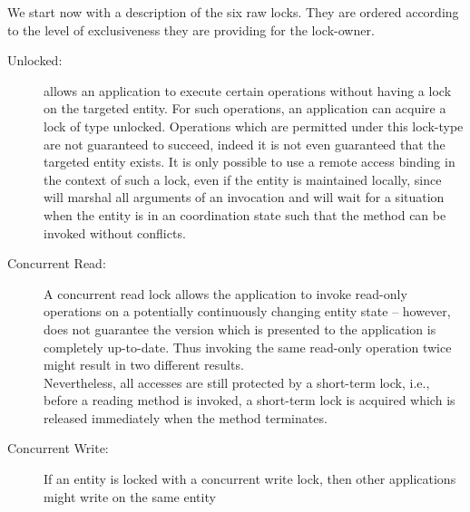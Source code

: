 \documentclass[a4paper, 10pt]{book}
\begin{document}
                        We start now with a description of the six raw locks. They are ordered
                        according to the level of exclusiveness they are providing for the
                        lock-owner. 
                        \begin{description}
                            \item[Unlocked:] \SYNEIGHT allows an application to execute certain
                                operations without having a lock on the targeted entity. For such
                                operations, an application can acquire a lock of type unlocked.
                                Operations which are permitted under this lock-type are not
                                guaranteed to succeed, indeed it is not even guaranteed that the
                                targeted entity exists. 
                                It is only possible to use a remote access binding in the context of
                                such a lock, even if the entity is maintained locally, since \SYNEIGHT
                                will marshal all arguments of an invocation and will wait for a
                                situation when the entity is in an coordination state such that the
                                method can be invoked without conflicts. 
                                \item[Concurrent Read:] A concurrent read lock allows the application
                                    to invoke read-only operations on a potentially continuously
                                    changing entity state -- however, \SYNEIGHT does not guarantee the
                                    version which is presented to the application is completely
                                    up-to-date. Thus invoking the same read-only operation twice might
                                    result in two different results.\\
                                    Nevertheless, all accesses are still protected by a short-term lock,
                                    i.e., before a reading method is invoked, a short-term lock is
                                    acquired which is released immediately when the method terminates.
                                \item[Concurrent Write:] If an entity is locked with a concurrent
                                    write lock, then other applications might write on the same entity

\end{description}
\end{document}
